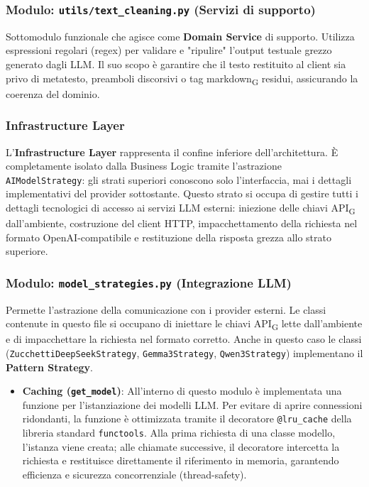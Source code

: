 \documentclass[11pt,a4paper]{article}
\newcommand{\gls}[1]{#1\textsubscript{G}}
\begin{document}
\subsubsection{Modulo: \texttt{utils/text\_cleaning.py} (Servizi di supporto)}
Sottomodulo funzionale che agisce come \textbf{Domain Service} di supporto. Utilizza espressioni regolari (regex) per validare e "ripulire" l'output testuale grezzo generato dagli LLM. Il suo scopo è garantire che il testo restituito al client sia privo di metatesto, preamboli discorsivi o tag \gls{markdown} residui, assicurando la coerenza del dominio.

\subsubsection{Infrastructure Layer}
L'\textbf{Infrastructure Layer} rappresenta il confine inferiore 
dell'architettura. È completamente isolato dalla Business Logic tramite 
l'astrazione \texttt{AIModelStrategy}: gli strati superiori conoscono 
solo l'interfaccia, mai i dettagli implementativi del provider sottostante.
Questo strato si occupa di gestire tutti i dettagli tecnologici di 
accesso ai servizi LLM esterni: iniezione delle chiavi \gls{API} 
dall'ambiente, costruzione del client HTTP, impacchettamento della 
richiesta nel formato OpenAI-compatibile e restituzione della risposta 
grezza allo strato superiore.

\subsubsection{Modulo: \texttt{model\_strategies.py} (Integrazione LLM)}
Permette l'astrazione della comunicazione con i provider esterni. Le classi contenute in questo file si occupano di iniettare le chiavi \gls{API} lette dall'ambiente e di impacchettare la richiesta nel formato corretto. Anche in questo caso le classi (\texttt{ZucchettiDeepSeekStrategy}, \texttt{Gemma3Strategy}, \texttt{Qwen3Strategy}) implementano il \textbf{Pattern Strategy}.
\begin{itemize}
    \item \textbf{Caching (\texttt{get\_model})}: All'interno di questo modulo è implementata una funzione per l'istanziazione dei modelli LLM. Per evitare di aprire connessioni ridondanti, la funzione è ottimizzata tramite il decoratore \texttt{@lru\_cache} della libreria standard \texttt{functools}. Alla prima richiesta di una classe modello, l'istanza viene creata; alle chiamate successive, il decoratore intercetta la richiesta e restituisce direttamente il riferimento in memoria, garantendo efficienza e sicurezza concorrenziale (thread-safety).
\end{itemize}
\end{document}
